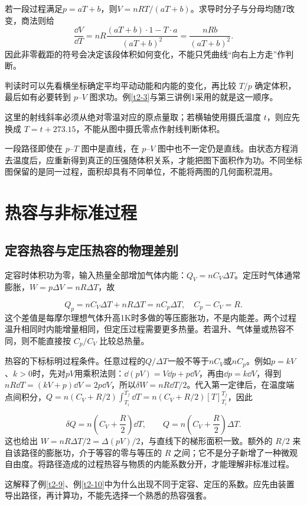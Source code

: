若一段过程满足$p=aT+b$，则$V=nRT/(aT+b)$。求导时分子与分母均随$T$改变，商法则给
\[
\frac{\dd V}{\dd T}
=nR\frac{(aT+b)\cdot1-T\cdot a}{(aT+b)^2}
=\frac{nRb}{(aT+b)^2}.
\]
因此非零截距的符号会决定该段体积如何变化，不能只凭曲线“向右上方走”作判断。

判读时可以先看横坐标确定平均平动动能和内能的变化，再比较 $T/p$ 确定体积，最后如有必要转到 $p$--$V$ 图求功。例\ref{t2-3}与第三讲例1采用的就是这一顺序。

这里的射线斜率必须从绝对零温对应的原点量取；若横轴使用摄氏温度 $t$，则应先换成 $T=t+273.15$，不能从图中摄氏零点作射线判断体积。


一段路径即使在 $p$--$T$ 图中是直线，在 $p$--$V$ 图中也不一定仍是直线。由状态方程消去温度后，应重新得到真正的压强随体积关系，才能把图下面积作为功。不同坐标图保留的是同一过程，面积却具有不同单位，不能将两图的几何面积混用。


\section{热容与非标准过程}
\subsection{定容热容与定压热容的物理差别}
定容时体积功为零，输入热量全部增加气体内能：$Q_V=nC_V\Delta T$。定压时气体通常膨胀，$W=p\Delta V=nR\Delta T$，故

\[Q_p=nC_V\Delta T+nR\Delta T=nC_p\Delta T,\quad\boxed{C_p-C_V=R}.
\]
这个差值是每摩尔理想气体升高1K时多做的等压膨胀功，不是内能差。两个过程温升相同时内能增量相同，但定压过程需要更多热量。若温升、气体量或热容不同，则不能直接按 $C_p/C_V$ 比较总热量。

热容的下标标明过程条件。任意过程的$Q/\Delta T$一般不等于$nC_V$或$nC_p$。例如$p=kV$、$k>0$时，先对$pV$用乘积法则：$\dd(pV)=V\dd p+p\dd V$，再由$\dd p=k\dd V$，得到$nR\dd T=(kV+p)\dd V=2p\dd V$，所以$\delta W=nR\dd T/2$。代入第一定律后，在温度端点间积分，$Q=n(C_V+R/2)\int_{T_i}^{T_f}\dd T=n(C_V+R/2)[T]_{T_i}^{T_f}$，因此

\[
 \delta Q=n\left(C_V+\frac R2\right)\dd T,\qquad
 Q=n\left(C_V+\frac R2\right)\Delta T.
\]
这也给出 $W=nR\Delta T/2=\Delta(pV)/2$，与直线下的梯形面积一致。额外的 $R/2$ 来自该路径的膨胀功，介于等容的零与等压的 $R$ 之间；它不是分子新增了一种微观自由度。将路径造成的过程热容与物质的内能系数分开，才能理解非标准过程。

这解释了例\ref{t2-9}、例\ref{t2-10}中为什么出现不同于定容、定压的系数。应先由装置导出路径，再计算功，不能先选择一个熟悉的热容强套。


